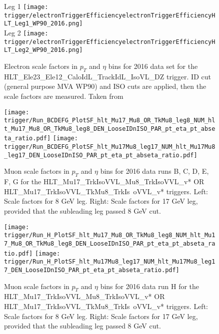 \begin{figure}
\centering
\subfloat Leg 1
{\texttt{[image: trigger/electronTriggerEfficiencyelectronTriggerEfficiencyHLT\_Leg1\_WP90\_2016.png]} } \\
\subfloat Leg 2
{\texttt{[image: trigger/electronTriggerEfficiencyelectronTriggerEfficiencyHLT\_Leg2\_WP90\_2016.png]} } \\
\caption{Electron scale factors in $p_{T}$ and $\eta$ bins for 2016 data set for the HLT\_Ele23\_Ele12\_CaloIdL\_TrackIdL\_IsoVL\_DZ trigger. ID cut (general purpose MVA WP90) and ISO cuts are applied, then the scale factors are measured. Taken from ~\cite{vhbbAN}}
\label{fig:trigger_eff_diele}
\end{figure}


\begin{figure}
\centering
\texttt{[image: trigger/Run\_BCDEFG\_PlotSF\_hlt\_Mu17\_Mu8\_OR\_TkMu8\_leg8\_NUM\_hlt\_Mu17\_Mu8\_OR\_TkMu8\_leg8\_DEN\_LooseIDnISO\_PAR\_pt\_eta\_pt\_abseta\_ratio.pdf]}
\texttt{[image: trigger/Run\_BCDEFG\_PlotSF\_hlt\_Mu17Mu8\_leg17\_NUM\_hlt\_Mu17Mu8\_leg17\_DEN\_LooseIDnISO\_PAR\_pt\_eta\_pt\_abseta\_ratio.pdf]}\\
\caption{Muon scale factors in $p_{T}$ and $\eta$ bins for 2016 data runs B, C, D, E, F, G for the  HLT\_Mu17\_TrkIsoVVL\_Mu8\_TrkIsoVVL\_v* OR HLT\_Mu17\_TrkIsoVVL\_TkMu8\_TrkIs\
oVVL\_v* triggers. Left: Scale factors for 8 GeV leg. Right: Scale factors for 17 GeV leg, provided that the subleading leg passed 8 GeV cut.}
\label{fig:trigger_SF_dimu_BCDEFG}
\end{figure}

\begin{figure}
\centering
\texttt{[image: trigger/Run\_H\_PlotSF\_hlt\_Mu17\_Mu8\_OR\_TkMu8\_leg8\_NUM\_hlt\_Mu17\_Mu8\_OR\_TkMu8\_leg8\_DEN\_LooseIDnISO\_PAR\_pt\_eta\_pt\_abseta\_ratio.pdf]}
\texttt{[image: trigger/Run\_H\_PlotSF\_hlt\_Mu17Mu8\_leg17\_NUM\_hlt\_Mu17Mu8\_leg17\_DEN\_LooseIDnISO\_PAR\_pt\_eta\_pt\_abseta\_ratio.pdf]}\\
\caption{Muon scale factors in $p_{T}$ and $\eta$ bins for 2016 data run H for the  HLT\_Mu17\_TrkIsoVVL\_Mu8\_TrkIsoVVL\_v* OR HLT\_Mu17\_TrkIsoVVL\_TkMu8\_TrkIs\
oVVL\_v* triggers. Left: Scale factors for 8 GeV leg. Right: Scale factors for 17 GeV leg, provided that the subleading leg passed 8 GeV cut.}

\label{fig:trigger_SF_dimu_H}
\end{figure}

